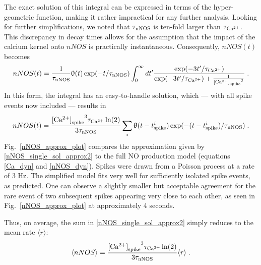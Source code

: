 \documentclass[10pt,letterpaper]{article}
\begin{document}
The exact solution of this integral can be expressed in terms of the hyper-geometric function, making it rather impractical for any further analysis. Looking for further simplifications, we noted that $\tau_{\rm nNOS}$ is ten-fold larger than $\tau_{\rm Ca^{2+}}$. This discrepancy in decay times allows for the assumption that the impact of the calcium kernel onto $nNOS$ is practically instantaneous. Consequently, $nNOS(t)$ becomes
\begin{equation}
nNOS(t) = \frac{1}{\tau_{\rm nNOS}} \uptheta(t) \exp(-t/\tau_{\rm nNOS}) \int_{0}^\infty dt' \frac{\exp(-3t'/\tau_{\rm Ca^{2+}})}{\exp(-3t'/\tau_{\rm Ca^{2+}}) + \frac{1}{{{\rm [Ca^{2+}]}_{\rm spike}}^3}}\;.
\label{nNOS_single_sol_approx1}
\end{equation}
In this form, the integral has an easy-to-handle solution, which --- with all spike events now included --- results in
\begin{equation}
nNOS(t) = \frac{{{\rm [Ca^{2+}]}_{\rm spike}}^3 \tau_{\rm Ca^{2+}}\ln(2)}{3\tau_{\rm nNOS}} \sum_i \uptheta(t-t^i_{\rm spike}) \exp(-(t-t^i_{\rm spike})/\tau_{\rm nNOS})\;.
\label{nNOS_single_sol_approx2}
\end{equation}
Fig.~\ref{nNOS_approx_plot} compares the approximation given by \eqref{nNOS_single_sol_approx2} to the full NO production model (equations \eqref{Ca_dyn} and \eqref{nNOS_dyn}). Spikes were drawn from a Poisson process at a rate of 3 Hz. The simplified model fits very well for sufficiently isolated spike events, as predicted. One can observe a slightly smaller but acceptable agreement for the rare event of two subsequent spikes appearing very close to each other, as seen in Fig.~\ref{nNOS_approx_plot} at approximately 4 seconds.

Thus, on average, the sum in \eqref{nNOS_single_sol_approx2} simply reduces to the mean rate $\langle r \rangle$:
\begin{equation}
\langle nNOS \rangle = \frac{{{\rm [Ca^{2+}]}_{\rm spike}}^3 \tau_{\rm Ca^{2+}}\ln(2)}{3\tau_{\rm nNOS}} \langle r \rangle \; .
\label{nNOS_single_sol_approx3}
\end{equation}
\end{document}
